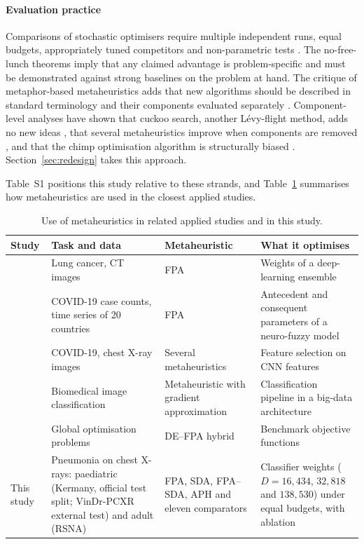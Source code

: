 \documentclass[preprint,12pt]{elsarticle}
\begin{document}
\paragraph{Evaluation practice} Comparisons of stochastic optimisers require multiple independent runs, equal budgets, appropriately tuned competitors and non-parametric tests \citep{derrac2011tutorial,demsar2006,eiben2011parameter}. The no-free-lunch theorems \citep{wolpert1997nfl} imply that any claimed advantage is problem-specific and must be demonstrated against strong baselines on the problem at hand. The critique of metaphor-based metaheuristics \citep{sorensen2015metaphor,camacho2023exposing} adds that new algorithms should be described in standard terminology and their components evaluated separately \citep{lones2020metaphors}. Component-level analyses have shown that cuckoo search, another Lévy-flight method, adds no new ideas \citep{camacho2022cuckoo}, that several metaheuristics improve when components are removed \citep{piotrowski2018simplified}, and that the chimp optimisation algorithm is structurally biased \citep{deng2024chimp}. Section~\ref{sec:redesign} takes this approach.

Table~S1 positions this study relative to these strands, and Table~\ref{tab:related} summarises how metaheuristics are used in the closest applied studies.


\begin{table}[!t]
\centering
\caption{Use of metaheuristics in related applied studies and in this study.}
\label{tab:related}
\footnotesize
\begin{tabular}{>{\raggedright\arraybackslash}p{2.6cm}>{\raggedright\arraybackslash}p{3.3cm}>{\raggedright\arraybackslash}p{2.5cm}>{\raggedright\arraybackslash}p{3.6cm}}
\toprule
Study & Task and data & Metaheuristic & What it optimises \\
\midrule
\citet{zhou2025fpaensemble} & Lung cancer, CT images & FPA & Weights of a deep-learning ensemble \\
\citet{kaya2024fpaanfis} & COVID-19 case counts, time series of 20 countries & FPA & Antecedent and consequent parameters of a neuro-fuzzy model \\
\citet{elkenawy2021} & COVID-19, chest X-ray images & Several metaheuristics & Feature selection on CNN features \\
\citet{almutairi2024} & Biomedical image classification & Metaheuristic with gradient approximation & Classification pipeline in a big-data architecture \\
\citet{song2024defpa} & Global optimisation problems & DE--FPA hybrid & Benchmark objective functions \\
This study & Pneumonia on chest X-rays: paediatric (Kermany, official test split; VinDr-PCXR external test) and adult (RSNA) & FPA, SDA, FPA--SDA, APH and eleven comparators & Classifier weights ($D=16{,}434$, $32{,}818$ and $138{,}530$) under equal budgets, with ablation \\
\bottomrule
\end{tabular}
\end{table}
\end{document}
